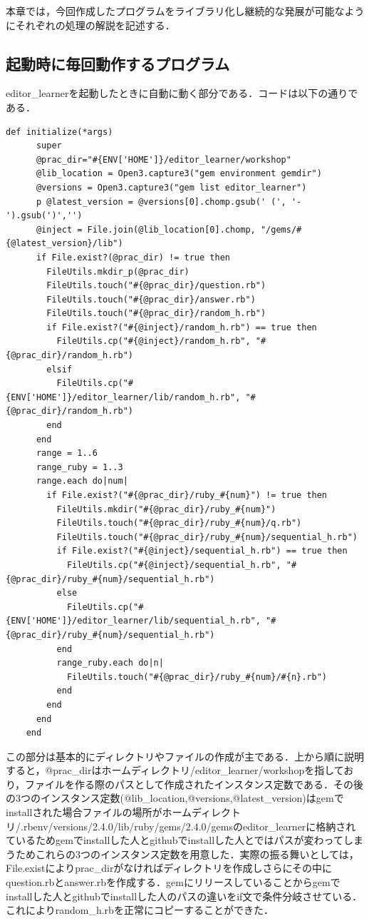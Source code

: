 \documentclass[11pt,dvipdfmx]{jsarticle}
\begin{document}
本章では，今回作成したプログラムをライブラリ化し継続的な発展が可能なようにそれぞれの処理の解説を記述する．

    \subsection{起動時に毎回動作するプログラム}\label{ux8d77ux52d5ux6642ux306bux6bceux56deux52d5ux4f5cux3059ux308bux30d7ux30edux30b0ux30e9ux30e0}

editor\_learnerを起動したときに自動に動く部分である．コードは以下の通りである．

\begin{verbatim}
def initialize(*args)
      super
      @prac_dir="#{ENV['HOME']}/editor_learner/workshop"
      @lib_location = Open3.capture3("gem environment gemdir")
      @versions = Open3.capture3("gem list editor_learner")
      p @latest_version = @versions[0].chomp.gsub(' (', '-').gsub(')','')
      @inject = File.join(@lib_location[0].chomp, "/gems/#{@latest_version}/lib")
      if File.exist?(@prac_dir) != true then
        FileUtils.mkdir_p(@prac_dir)
        FileUtils.touch("#{@prac_dir}/question.rb")
        FileUtils.touch("#{@prac_dir}/answer.rb")
        FileUtils.touch("#{@prac_dir}/random_h.rb")
        if File.exist?("#{@inject}/random_h.rb") == true then
          FileUtils.cp("#{@inject}/random_h.rb", "#{@prac_dir}/random_h.rb")
        elsif
          FileUtils.cp("#{ENV['HOME']}/editor_learner/lib/random_h.rb", "#{@prac_dir}/random_h.rb")
        end
      end
      range = 1..6
      range_ruby = 1..3
      range.each do|num|
        if File.exist?("#{@prac_dir}/ruby_#{num}") != true then
          FileUtils.mkdir("#{@prac_dir}/ruby_#{num}")
          FileUtils.touch("#{@prac_dir}/ruby_#{num}/q.rb")
          FileUtils.touch("#{@prac_dir}/ruby_#{num}/sequential_h.rb")
          if File.exist?("#{@inject}/sequential_h.rb") == true then
            FileUtils.cp("#{@inject}/sequential_h.rb", "#{@prac_dir}/ruby_#{num}/sequential_h.rb")
          else
            FileUtils.cp("#{ENV['HOME']}/editor_learner/lib/sequential_h.rb", "#{@prac_dir}/ruby_#{num}/sequential_h.rb")
          end
          range_ruby.each do|n|
            FileUtils.touch("#{@prac_dir}/ruby_#{num}/#{n}.rb")
          end
        end
      end
    end
\end{verbatim}

この部分は基本的にディレクトリやファイルの作成が主である．上から順に説明すると，@prac\_dirはホームディレクトリ/editor\_learner/workshopを指しており，ファイルを作る際のパスとして作成されたインスタンス定数である．その後の3つのインスタンス定数(@lib\_location,@versions,@latest\_version)はgemでinstallされた場合ファイルの場所がホームディレクトリ/.rbenv/versions/2.4.0/lib/ruby/gems/2.4.0/gemsのeditor\_learnerに格納されているためgemでinstallした人とgithubでinstallした人とではパスが変わってしまうためこれらの3つのインスタンス定数を用意した．実際の振る舞いとしては，File.existによりprac\_dirがなければディレクトリを作成しさらにその中にquestion.rbとanswer.rbを作成する．gemにリリースしていることからgemでinstallした人とgithubでinstallした人のパスの違いをif文で条件分岐させている．これによりrandom\_h.rbを正常にコピーすることができた．
\end{document}
